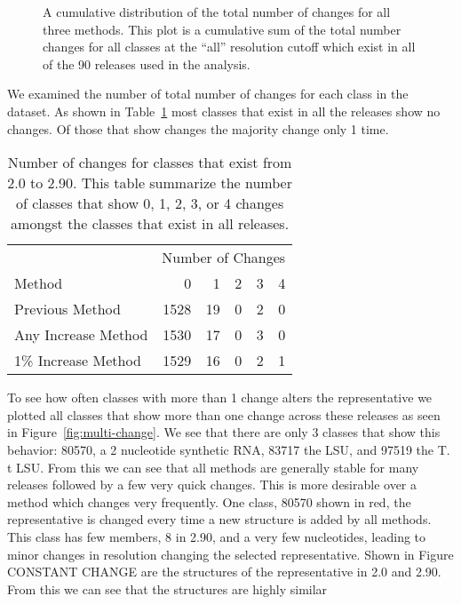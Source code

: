 \begin{figure}
  \caption{A cumulative distribution of the total number of changes for all
    three methods. This plot is a cumulative sum of the total number changes for
    all classes at the ``all'' resolution cutoff which exist in all of the 90
  releases used in the analysis.}
  \label{fig:rep-changes}
\end{figure}

We examined the number of total number of changes for each class in the dataset.
As shown in Table~\ref{tab:rep-changes-count} most classes that exist in all the
releases show no changes. Of those that show changes the majority change only 1
time.

\begin{table}
  \begin{tabular}{lrrrrr}
    \toprule
                        & \multicolumn{5}{c}{Number of Changes} \\
    Method              & 0    & 1  &  2 &  3 &  4 \\
    \midrule
    Previous Method     & 1528 & 19 &  0 &  2 &  0 \\
    Any Increase Method & 1530 & 17 &  0 &  3 &  0 \\
    1\% Increase Method & 1529 & 16 &  0 &  2 &  1 \\
    \bottomrule
  \end{tabular}
  \caption{Number of changes for classes that exist from 2.0 to 2.90. This table
    summarize the number of classes that show 0, 1, 2, 3, or 4 changes amongst
  the classes that exist in all releases. }
  \label{tab:rep-changes-count}
\end{table}

To see how often classes with more than 1 change alters the representative we
plotted all classes that show more than one change across these releases as seen
in Figure~\ref{fig:multi-change}. We see that there are only 3 classes that show
this behavior: 80570, a 2 nucleotide synthetic RNA, 83717 the \EC{} LSU, and
97519 the T. t LSU. From this we can see that all methods are generally stable
for many releases followed by a few very quick changes. This is more
desirable over a method which changes very frequently. One class, 80570
shown in red, the representative is changed every time a new structure is
added by all methods. This class has few members, 8 in 2.90, and a very
few nucleotides, leading to minor changes in resolution changing the
selected representative. Shown in Figure CONSTANT CHANGE are the
structures of the representative in 2.0 and 2.90. From this we can see
that the structures are highly similar


